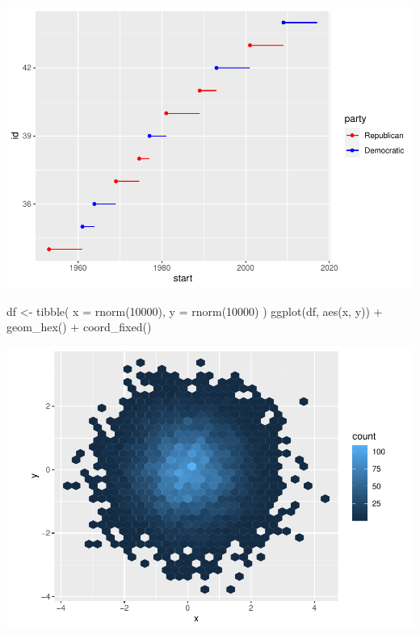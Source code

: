 \documentclass[
]{article}
\newenvironment{Shaded}{\begin{snugshade}}{\end{snugshade}}
\newcommand{\AttributeTok}[1]{\textcolor[rgb]{0.77,0.63,0.00}{#1}}
\newcommand{\DecValTok}[1]{\textcolor[rgb]{0.00,0.00,0.81}{#1}}
\newcommand{\FunctionTok}[1]{\textcolor[rgb]{0.00,0.00,0.00}{#1}}
\newcommand{\NormalTok}[1]{#1}
\newcommand{\OtherTok}[1]{\textcolor[rgb]{0.56,0.35,0.01}{#1}}
\newcommand{\SpecialCharTok}[1]{\textcolor[rgb]{0.00,0.00,0.00}{#1}}
\begin{document}
\includegraphics{Journal_files/figure-latex/unnamed-chunk-66-1.pdf}

\begin{Shaded}
\begin{Highlighting}[]
\NormalTok{df }\OtherTok{\textless{}{-}} \FunctionTok{tibble}\NormalTok{(}
  \AttributeTok{x =} \FunctionTok{rnorm}\NormalTok{(}\DecValTok{10000}\NormalTok{),}
  \AttributeTok{y =} \FunctionTok{rnorm}\NormalTok{(}\DecValTok{10000}\NormalTok{)}
\NormalTok{)}
\FunctionTok{ggplot}\NormalTok{(df, }\FunctionTok{aes}\NormalTok{(x, y)) }\SpecialCharTok{+}
  \FunctionTok{geom\_hex}\NormalTok{() }\SpecialCharTok{+}
  \FunctionTok{coord\_fixed}\NormalTok{()}
\end{Highlighting}
\end{Shaded}

\includegraphics{Journal_files/figure-latex/unnamed-chunk-66-2.pdf}
\end{document}
